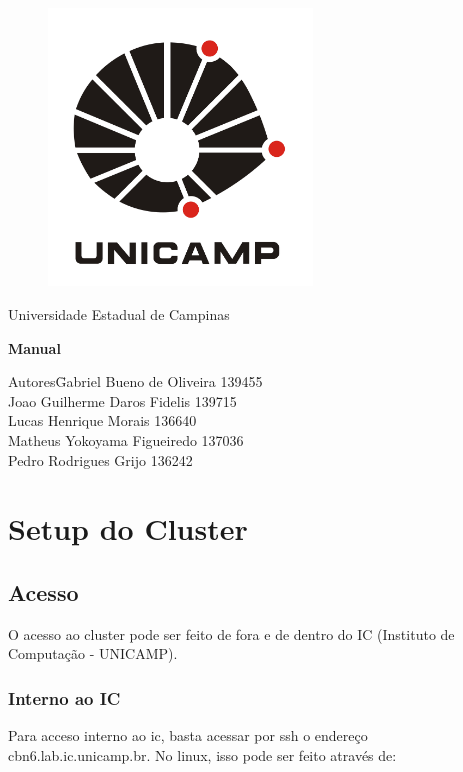 \documentclass[a4paper,10pt]{article}
\date{\today}
\begin{document}
	\begin{titlepage}
		\begin{figure}
			\centering
			\includegraphics[width=7cm,keepaspectratio=true]{imagens/unicamp.png}
	
		\end{figure}
		\begin{center}
			\huge{Universidade Estadual de Campinas}
		
		\vfill
		\textbf{\LARGE{Manual}}
		\vfill
		\end{center}
		
		\begin{flushleft}
			\begin{tabbing}
				Autores\qquad\qquad\= Gabriel Bueno de Oliveira 139455 \\
					\>Joao Guilherme Daros Fidelis 139715 \\
					\>Lucas Henrique Morais 136640\\
					\>Matheus Yokoyama Figueiredo 137036\\
					\>Pedro Rodrigues Grijo 136242\\
			\end{tabbing}
		\end{flushleft}
	\end{titlepage}

\newpage
\section{Setup do Cluster}
    \subsection{Acesso}
    O acesso ao cluster pode ser feito de fora e de dentro do IC (Instituto de Computação - UNICAMP).
        \subsubsection{Interno ao IC}
        Para acceso interno ao ic, basta acessar por ssh o endereço cbn6.lab.ic.unicamp.br. No linux, isso pode ser feito através de:
        
\end{document}
